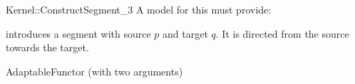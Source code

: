 \begin{ccRefFunctionObjectConcept}{Kernel::ConstructSegment_3}
A model for this must provide:


            {introduces a segment  with source $p$
             and target $q$. It is directed from the source towards
             the target.}


\ccRefines
AdaptableFunctor (with two arguments)

\ccSeeAlso
{}\\

\end{ccRefFunctionObjectConcept}
